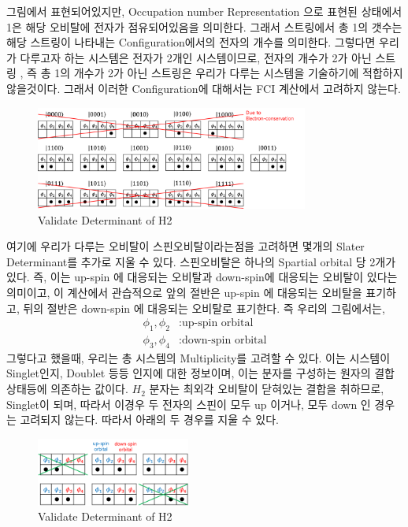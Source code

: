 \documentclass[11pt]{article}
\begin{document}
그림에서 표현되어있지만, Occupation number Representation 으로 표현된 상태에서 1은 해당 오비탈에 전자가 점유되어있음을 의미한다. 
그래서 스트링에서 총 1의 갯수는 해당 스트링이 나타내는 Configuration에서의 전자의 개수를 의미한다. 
그렇다면 우리가 다루고자 하는 시스템은 전자가 2개인 시스템이므로, 전자의 개수가 2가 아닌 스트링 , 즉 총 1의 개수가 2가 아닌 스트링은 우리가 다루는 시스템을 기술하기에 적합하지 않을것이다. 
그래서 이러한 Configuration에 대해서는 FCI 계산에서 고려하지 않는다. 
\begin{figure}[htbp]
  \centering
  \includegraphics[width=0.8\textwidth]{fig/Elec_cons.png}
  \caption{Validate Determinant of H2}
  \label{fig:example2}
\end{figure}
여기에 우리가 다루는 오비탈이 스핀오비탈이라는점을 고려하면 몇개의 Slater Determinant를 추가로 지울 수 있다. 
스핀오비탈은 하나의 Spartial orbital 당 2개가 있다. 즉, 이는 up-spin 에 대응되는 오비탈과 down-spin에 대응되는 오비탈이 있다는 의미이고, 
이 계산에서 관습적으로 앞의 절반은 up-spin 에 대응되는 오비탈을 표기하고, 뒤의 절반은 down-spin 에 대응되는 오비탈로 표기한다. 즉 우리의 그림에서는,
\begin{align*}
\phi_1, \phi_2 &: \text{up-spin orbital} \\
\phi_3, \phi_4 &: \text{down-spin orbital}
\end{align*}
그렇다고 했을때, 우리는 총 시스템의 Multiplicity를 고려할 수 있다. 이는 시스템이 Singlet인지, Doublet 등등 인지에 대한 정보이며, 이는 분자를 구성하는 원자의 결합상태등에 의존하는 값이다. 
\(H_2\) 분자는 최외각 오비탈이 닫혀있는 결합을 취하므로, Singlet이 되며, 따라서 이경우 두 전자의 스핀이 모두 up 이거나, 모두 down 인 경우는 고려되지 않는다. 따라서 아래의 두 경우를 지울 수 있다. 
\begin{figure}[htbp]
  \centering
  \includegraphics[width=0.45\textwidth]{fig/spin_cons.png}
  \caption{Validate Determinant of H2}
  \label{fig:example2}
\end{figure}
\end{document}
